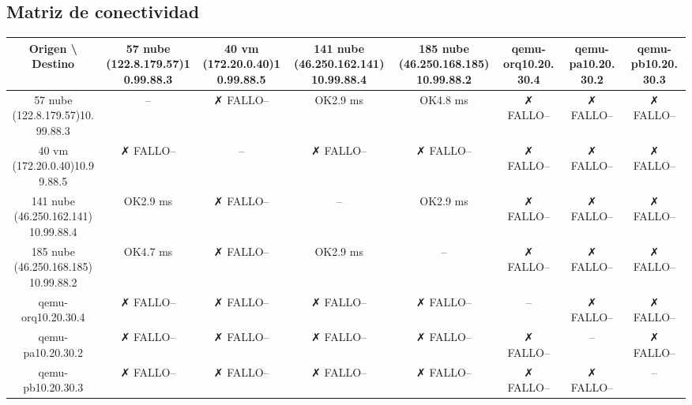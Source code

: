 \documentclass[11pt,a4paper]{article}
\begin{document}
\subsection{Matriz de conectividad}
\begin{longtable}{|c|c|c|c|c|c|c|c|}
\hline
Origen \textbackslash{} Destino & 57 nube (122.8.179.57)10.99.88.3 & 40 vm (172.20.0.40)10.99.88.5 & 141 nube (46.250.162.141)10.99.88.4 & 185 nube (46.250.168.185)10.99.88.2 & qemu-orq10.20.30.4 & qemu-pa10.20.30.2 & qemu-pb10.20.30.3 \\ \hline
57 nube (122.8.179.57)10.99.88.3 & -- & ✗ FALLO-- & OK2.9 ms & OK4.8 ms & ✗ FALLO-- & ✗ FALLO-- & ✗ FALLO-- \\ \hline
40 vm (172.20.0.40)10.99.88.5 & ✗ FALLO-- & -- & ✗ FALLO-- & ✗ FALLO-- & ✗ FALLO-- & ✗ FALLO-- & ✗ FALLO-- \\ \hline
141 nube (46.250.162.141)10.99.88.4 & OK2.9 ms & ✗ FALLO-- & -- & OK2.9 ms & ✗ FALLO-- & ✗ FALLO-- & ✗ FALLO-- \\ \hline
185 nube (46.250.168.185)10.99.88.2 & OK4.7 ms & ✗ FALLO-- & OK2.9 ms & -- & ✗ FALLO-- & ✗ FALLO-- & ✗ FALLO-- \\ \hline
qemu-orq10.20.30.4 & ✗ FALLO-- & ✗ FALLO-- & ✗ FALLO-- & ✗ FALLO-- & -- & ✗ FALLO-- & ✗ FALLO-- \\ \hline
qemu-pa10.20.30.2 & ✗ FALLO-- & ✗ FALLO-- & ✗ FALLO-- & ✗ FALLO-- & ✗ FALLO-- & -- & ✗ FALLO-- \\ \hline
qemu-pb10.20.30.3 & ✗ FALLO-- & ✗ FALLO-- & ✗ FALLO-- & ✗ FALLO-- & ✗ FALLO-- & ✗ FALLO-- & -- \\ \hline
\end{longtable}
\end{document}
